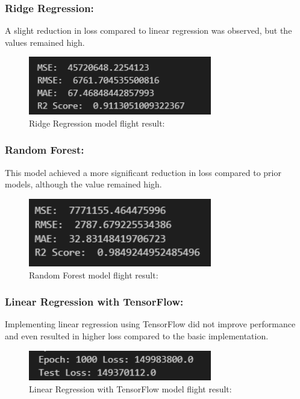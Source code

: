\documentclass{article}
\begin{document}
\subsubsection{Ridge Regression: }A slight reduction in loss compared to linear regression was observed, but the values remained high.
\begin{figure}[H]
    \caption{Ridge Regression model flight result:}
    \centering
    \includegraphics[width=8cm]{imgFolder/ridgeRegressionFlight.png}
\end{figure}

\subsubsection{Random Forest: }This model achieved a more significant reduction in loss compared to prior models, although the value remained high.
\begin{figure}[H]
    \caption{Random Forest model flight result:}
    \centering
    \includegraphics[width=8cm]{imgFolder/randomForestFlight.png}
\end{figure}

\subsubsection{Linear Regression with TensorFlow: }Implementing linear regression using TensorFlow did not improve performance and even resulted in higher loss compared to the basic implementation.
\begin{figure}[H]
    \caption{Linear Regression with TensorFlow model flight result:}
    \centering
    \includegraphics[width=8cm]{imgFolder/linearRegressionTensorflowFlight.png}
\end{figure}
\end{document}
